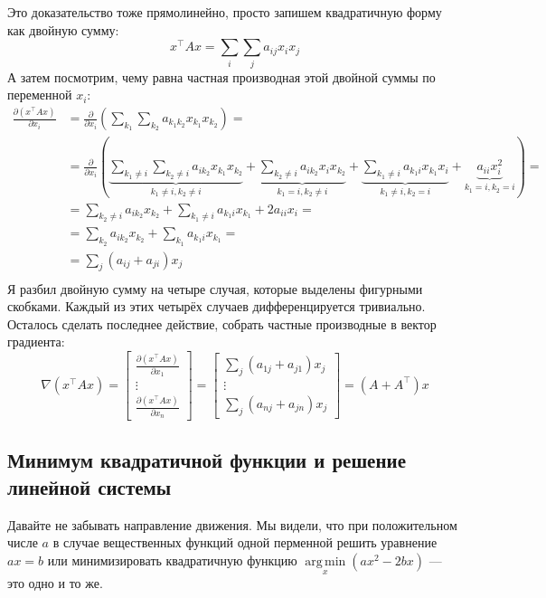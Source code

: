 \documentclass[notitlepage]{report}
\DeclareMathOperator*{\argmin}{arg\,min}
\begin{document}
Это доказательство тоже прямолинейно, просто запишем квадратичную форму как двойную сумму:
$$x^\top A x = \sum\limits_i\sum\limits_j a_{ij} x_i x_j$$
А затем посмотрим, чему равна частная производная этой двойной суммы по переменной $x_i$:
\begin{align*}
\frac{\partial (x^\top A x)}{\partial x_i} 
&= \frac{\partial}{\partial x_i}  \left(\sum\limits_{k_1}\sum\limits_{k_2} a_{k_1 k_2} x_{k_1} x_{k_2}\right) = \\
&= \frac{\partial}{\partial x_i}  \left(
\underbrace{\sum\limits_{k_1\neq i}\sum\limits_{k_2\neq i} a_{ik_2}x_{k_1} x_{k_2}}_{k_1 \neq i, k_2 \neq i}+\underbrace{\sum\limits_{k_2\neq i} a_{ik_2}x_i x_{k_2}}_{k_1 = i, k_2\neq i}+
\underbrace{\sum\limits_{k_1\neq i} a_{k_1 i} x_{k_1} x_i}_{k_1 \neq i, k_2 = i}+
\underbrace{a_{ii}x_i^2}_{k_1 = i, k_2 = i}\right) = \\
& = \sum\limits_{k_2\neq i} a_{ik_2}x_{k_2} + \sum\limits_{k_1\neq i} a_{k_1 i} x_{k_1} + 2 a_{ii} x_i = \\
& = \sum\limits_{k_2} a_{ik_2}x_{k_2} + \sum\limits_{k_1} a_{k_1 i} x_{k_1} = \\
& = \sum\limits_{j} (a_{ij} + a_{ji}) x_j \\
\end{align*}
Я разбил двойную сумму на четыре случая, которые выделены фигурными скобками. Каждый из этих четырёх случаев дифференцируется тривиально. Осталось сделать последнее действие, собрать частные производные в вектор градиента:
$$\nabla(x^\top A x) = \begin{bmatrix}\frac{\partial (x^\top Ax)}{\partial x_1} \\ \vdots \\ \frac{\partial (x^\top A x)}{\partial x_n} \end{bmatrix}  = \begin{bmatrix}\sum\limits_{j} (a_{1j} + a_{j1}) x_j \\ \vdots \\ \sum\limits_{j} (a_{nj} + a_{jn}) x_j \end{bmatrix}  = (A+A^\top)x
$$

\subsection{Минимум квадратичной функции и решение линейной системы}
Давайте не забывать направление движения. Мы видели, что при положительном числе $a$ в случае вещественных функций одной перменной решить уравнение $ax=b$ или минимизировать квадратичную функцию $\argmin\limits_x(ax^2 - 2bx)$ --- это одно и то же.
\end{document}
